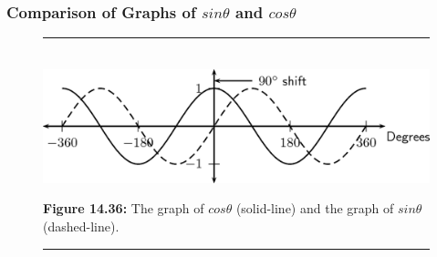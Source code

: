          
        
      
      \label{m39414*uid68}
            \subsubsection{ Comparison of Graphs of $sin\theta $ and $cos\theta $}
            \nopagebreak
            
        
        
    \setcounter{subfigure}{0}


	\begin{figure}[H] %
    \begin{center}
    \rule[.1in]{\figurerulewidth}{.005in} \\
        \label{m39414*uid69!!!underscore!!!media}\label{m39414*uid69!!!underscore!!!printimage}\includegraphics{col11306.imgs/m39414_MG10C15_030.png} %
        
      \vspace{2pt}
    \vspace{\rubberspace}\par \begin{cnxcaption}
	  \small \textbf{Figure 14.36: }The graph of \begin{math}cos\theta \end{math} (solid-line) and the graph of \begin{math}sin\theta \end{math} (dashed-line).
	\end{cnxcaption}
      
    \vspace{.1in}
    \rule[.1in]{\figurerulewidth}{.005in} \\
        
    \end{center}

 \end{figure}   

    \addtocounter{footnote}{-0}
    
